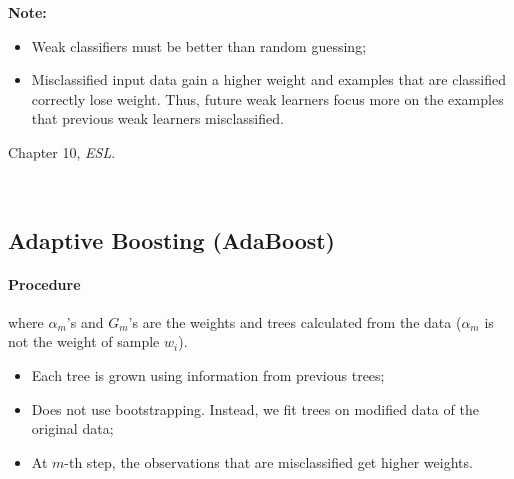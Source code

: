 \documentclass[12pt]{book}
\theoremstyle{definition}
\theoremstyle{remark}
\begin{document}
\textbf{Note:}
\begin{itemize}
    \item Weak classifiers must be better than random guessing;
    \item Misclassified input data gain a higher weight and examples that are classified correctly lose weight. Thus, future weak learners focus more on the examples that previous weak learners misclassified.
\end{itemize}

\begin{referencebox}
    Chapter 10, \textit{ESL}.
\end{referencebox}
\




\subsection{Adaptive Boosting (AdaBoost)}
\paragraph{Procedure}
\begin{center}
\end{center}

where $\alpha_m$'s and $G_m$'s are the weights and trees calculated from the data ($\alpha_m$ is not the weight of sample $w_i$).

\begin{notionbox}[Notes]
    \begin{itemize}
        \item Each tree is grown using information from previous trees;
        \item Does not use bootstrapping. Instead, we fit trees on modified data of the original data;
        \item At $m$-th step, the observations that are misclassified get higher weights.
    \end{itemize}
\end{notionbox}
\end{document}
